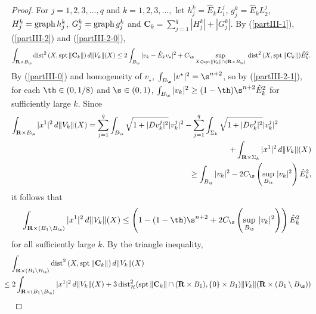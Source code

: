\documentclass[a4paper,11pt]{amsart}
\begin{document}
\begin{proof}
For $j=1, 2, 3, \ldots, q$ and $k=1,2, 3, \ldots,$ let $h_{j}^{k} = {\hat E}_{k}L_{1}^{j}$, $g_{j}^{k} = {\hat E}_{k} L_{2}^{j}$, $H_{j}^{k} = {\rm graph} \, h_{j}^{k}$, $G_{j}^{k} = {\rm graph} \, g_{j}^{k}$ and 
${\mathbf C}_{k} = \sum_{j=1}^{q} |H_{j}^{k}| + |G_{j}^{k}|.$ By (\ref{partIII-1}), (\ref{partIII-2}) and (\ref{partIII-2-0}), 
\begin{equation}\label{partIII-4-1}
\int_{{\mathbf R} \times B_{\s}} {\rm dist}^{2} \, (X, {\rm spt} \, \|{\mathbf C}_{k}\|) \, d\|V_{k}\|(X) \leq 2\int_{B_{\s}} |v_{k} - {\hat E}_{k}v_{\star}|^{2} + C_{\s} \sup_{X \in {\rm spt}  \|V_{k}\| 
\cap ({\mathbf R} \times B_{\s})} \, {\rm dist}^{2} \,(X, {\rm spt} \, \|{\mathbf C}_{k}\|){\hat E}_{k}^{2}.
\end{equation}
By (\ref{partIII-0}) and homogeneity of $v_{\star}$, $\int_{B_{\s}} |v^{\star}|^{2} = \s^{n+2}$, so by (\ref{partIII-2-1}), 
for each $\th \in (0, 1/8)$ and $\s \in (0, 1)$, $\int_{B_{\s}}|v_{k}|^{2} \geq (1-\th)\s^{n+2}{\hat E}_{k}^{2}$ for sufficiently large $k$. Since 
\begin{eqnarray*}
\int_{{\mathbf R} \times B_{\s}} |x^{1}|^{2} \, d\|V_{k}\|(X) = \sum_{j=1}^{q}\int_{B_{\s}} \sqrt{1 + |Dv_{k}^{j}|^{2}}|v_{k}^{j}|^{2}  - \sum_{j=1}^{q}\int_{\Sigma_{k}} \sqrt{1 + |Dv_{k}^{j}|^{2}}|v_{k}^{j}|^{2}&&\nonumber\\
&&\hspace{-1in} + \int_{{\mathbf R} \times \Sigma_{k}} |x^{1}|^{2} \, d\|V_{k}\|(X)\nonumber\\
&&\hspace{-4in}\geq \int_{B_{\s}}|v_{k}|^{2} - 2C_{\s}\left(\sup_{B_{\s}} \,|v_{k}|^{2}\right){\hat E}_{k}^{2},
\end{eqnarray*}
it follows that 
\begin{equation}\label{partIII-4-2}
\int_{{\mathbf R} \times (B_{1} \setminus B_{\s})} |x^{1}|^{2} \, d\|V_{k}\|(X) \leq \left(1 - (1-\th)\s^{n+2} + 2C_{\s}\left(\sup_{B_{\s}} \,|v_{k}|^{2}\right)\right){\hat E}_{k}^{2}
\end{equation}
for all sufficiently large $k$. By the triangle inequality, 
\begin{eqnarray}\label{partIII-4-3}
\int_{{\mathbf R} \times (B_{1} \setminus B_{\s})} {\rm dist}^{2} \, (X, {\rm spt} \, \|{\mathbf C}_{k}\|) \, d\|V_{k}\|(X)&&\nonumber\\ 
&&\hspace{-2.75in}\leq 2\int_{{\mathbf R} \times (B_{1} \setminus B_{\s})} |x^{1}|^{2} \, d\|V_{k}\|(X) + 3\,{\rm dist}_{\mathcal H}^{2}({\rm spt} \, \|{\mathbf C}_{k}\| \cap ({\mathbf R} \times B_{1}), \{0\} \times B_{1})\|V_{k}\|({\mathbf R} \times (B_{1} \setminus B_{\s}))\nonumber\\

\end{eqnarray}
\end{proof}
\end{document}
